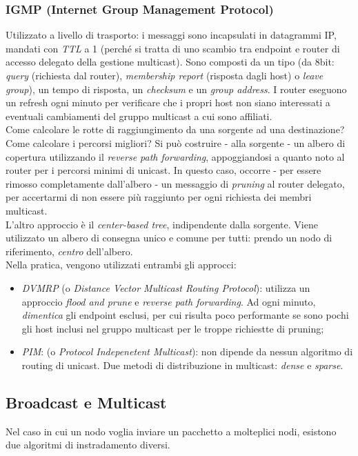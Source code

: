 \subsubsection{IGMP (Internet Group Management Protocol)}
Utilizzato a livello di trasporto: i messaggi sono incapsulati in datagrammi IP, mandati con \textit{TTL} a 1 (perché si tratta di uno scambio tra endpoint e router di accesso delegato della gestione multicast). Sono composti da un tipo (da 8bit: \textit{query} (richiesta dal router), \textit{membership report} (risposta dagli host) o \textit{leave group}), un tempo di risposta, un \textit{checksum} e un \textit{group address}. I router eseguono un refresh ogni minuto per verificare che i propri host non siano interessati a eventuali cambiamenti del gruppo multicast a cui sono affiliati. \\
Come calcolare le rotte di raggiungimento da una sorgente ad una destinazione? Come calcolare i percorsi migliori? Si può costruire - alla sorgente - un albero di copertura utilizzando il \textit{reverse path forwarding}, appoggiandosi a quanto noto al router per i percorsi minimi di unicast. In questo caso, occorre - per essere rimosso completamente dall'albero - un messaggio di \textit{pruning} al router delegato, per accertarmi di non essere più raggiunto per ogni richiesta dei membri multicast. \\
L'altro approccio è il \textit{center-based tree}, indipendente dalla sorgente. Viene utilizzato un albero di consegna unico e comune per tutti: prendo un nodo di riferimento, \textit{centro} dell'albero. \\
Nella pratica, vengono utilizzati entrambi gli approcci:
\begin{itemize}
	\item \textit{DVMRP} (o \textit{Distance Vector Multicast Routing Protocol}): utilizza un approccio \textit{flood and prune} e \textit{reverse path forwarding}. Ad ogni minuto, \textit{dimentica} gli endpoint esclusi, per cui risulta poco performante se sono pochi gli host inclusi nel gruppo multicast per le troppe richiestte di pruning;
	\item \textit{PIM}: (o \textit{Protocol Indepenetent Multicast}): non dipende da nessun algoritmo di routing di unicast. Due metodi di distribuzione in multicast: \textit{dense} e \textit{sparse}.
\end{itemize}

\subsection{Broadcast e Multicast}
Nel caso in cui un nodo voglia inviare un pacchetto a molteplici nodi, esistono due algoritmi di instradamento diversi.
